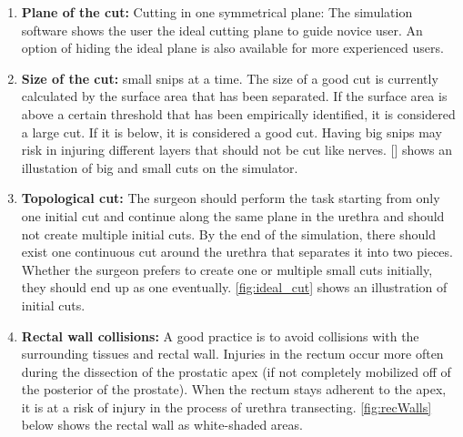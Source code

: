\begin{enumerate}[start=1,label={Para \#\arabic*, }]
	\item \textbf{Plane of the cut:} Cutting in one symmetrical plane: The simulation software shows the user the ideal cutting plane to guide novice user. An option of hiding the ideal plane is also available for more experienced users.

	\item \textbf{Size of the cut:} small snips at a time. The size of a good cut is currently calculated by the surface area that has been separated.  If the surface area is above a certain threshold that has been empirically identified, it is considered a large cut. If it is below, it is considered a good cut. Having big snips may risk in injuring different layers that should not be cut like nerves. [] shows an illustation of big and small cuts on the simulator.

	\item \textbf{Topological cut:} The surgeon should perform the task starting from only one initial cut and continue along the same plane in the urethra and should not create multiple initial cuts. By the end of the simulation, there should exist one continuous cut around the urethra that separates it into two pieces. Whether the surgeon prefers to create one or multiple small cuts initially, they should end up as one eventually. \autoref{fig:ideal_cut} shows an illustration of initial cuts.

	\item \textbf{Rectal wall collisions:} A good practice is to avoid collisions with the surrounding tissues and rectal wall. Injuries in the rectum occur more often during the dissection of the prostatic apex (if not completely mobilized off of the posterior of the prostate). When the rectum stays adherent to the apex, it is at a risk of injury in the process of urethra transecting. \autoref{fig:recWalls} below shows the rectal wall as white-shaded areas.


\end{enumerate}

